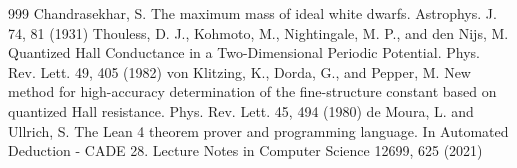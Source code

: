 \begin{thebibliography}{999}
 Chandrasekhar, S. The maximum mass of ideal white dwarfs. Astrophys. J. 74, 81 (1931)
 Thouless, D. J., Kohmoto, M., Nightingale, M. P., and den Nijs, M. Quantized Hall Conductance in a Two-Dimensional Periodic Potential. Phys. Rev. Lett. 49, 405 (1982)
 von Klitzing, K., Dorda, G., and Pepper, M. New method for high-accuracy determination of the fine-structure constant based on quantized Hall resistance. Phys. Rev. Lett. 45, 494 (1980)
 de Moura, L. and Ullrich, S. The Lean 4 theorem prover and programming language. In Automated Deduction - CADE 28. Lecture Notes in Computer Science 12699, 625 (2021)
\end{thebibliography}
